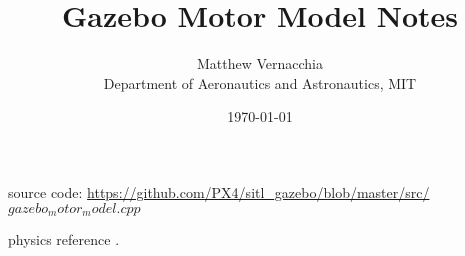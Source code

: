 \documentclass[12pt]{article}
\title{Gazebo Motor Model Notes}
\author{Matthew Vernacchia\\
Department of Aeronautics and Astronautics, MIT}
\date{\today}
\begin{document}
\maketitle

source code: \url{https://github.com/PX4/sitl_gazebo/blob/master/src/}
$gazebo_motor_model.cpp$

physics reference \cite{Unified}.

\printbibliography
\end{document}
